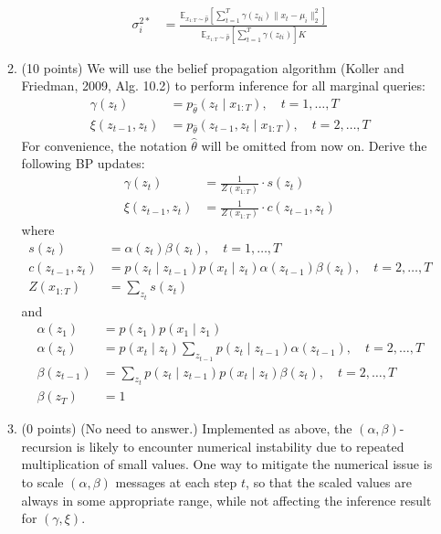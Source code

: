 \documentclass[a3paper,12pt]{extarticle} %
\begin{document}
\begin{enumerate}
\begin{enumerate}
\begin{align}
        \sigma_i^{2*} &= \frac{\mathbb{E}_{x_{1:T} \sim \hat{p}} \left[ \sum_{t=1}^{T} \gamma(z_{ti}) \|x_t - \mu_i\|_2^2 \right]}{\mathbb{E}_{x_{1:T} \sim \hat{p}} \left[ \sum_{t=1}^{T} \gamma(z_{ti}) \right] K} \tag{17}
    \end{align}
    \item (10 points) We will use the belief propagation algorithm (Koller and Friedman, 2009, Alg. 10.2) to perform inference for all marginal queries:
    \begin{align}
        \gamma(z_t) &= p_{\hat{\theta}}(z_t \mid x_{1:T}), \quad t = 1, \ldots, T \tag{18} \\
        \xi(z_{t-1}, z_t) &= p_{\hat{\theta}}(z_{t-1}, z_t \mid x_{1:T}), \quad t = 2, \ldots, T \tag{19}
    \end{align}
    For convenience, the notation $\hat{\theta}$ will be omitted from now on. Derive the following BP updates:
    \begin{align}
        \gamma(z_t) &= \frac{1}{Z(x_{1:T})} \cdot s(z_t) \tag{20} \\
        \xi(z_{t-1}, z_t) &= \frac{1}{Z(x_{1:T})} \cdot c(z_{t-1}, z_t) \tag{21}
    \end{align}
    where
    \begin{align}
        s(z_t) &= \alpha(z_t) \beta(z_t), \quad t = 1, \ldots, T \tag{23} \\
        c(z_{t-1}, z_t) &= p(z_t \mid z_{t-1}) p(x_t \mid z_t) \alpha(z_{t-1}) \beta(z_t), \quad t = 2, \ldots, T \tag{24} \\
        Z(x_{1:T}) &= \sum_{z_t} s(z_t) \tag{25}
    \end{align}
    and
    \begin{align}
        \alpha(z_1) &= p(z_1) p(x_1 \mid z_1) \tag{26} \\
        \alpha(z_t) &= p(x_t \mid z_t) \sum_{z_{t-1}} p(z_t \mid z_{t-1}) \alpha(z_{t-1}), \quad t = 2, \ldots, T \tag{27} \\
        \beta(z_{t-1}) &= \sum_{z_t} p(z_t \mid z_{t-1}) p(x_t \mid z_t) \beta(z_t), \quad t = 2, \ldots, T \tag{28} \\
        \beta(z_T) &= 1 \tag{29}
    \end{align}
    \item (0 points) (No need to answer.) Implemented as above, the $(\alpha, \beta)$-recursion is likely to encounter numerical instability due to repeated multiplication of small values. One way to mitigate the numerical issue is to scale $(\alpha, \beta)$ messages at each step $t$, so that the scaled values are always in some appropriate range, while not affecting the inference result for $(\gamma, \xi)$.


\end{enumerate}
\end{enumerate}
\end{document}
